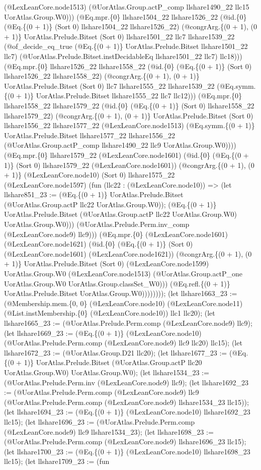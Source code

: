 \documentclass[11pt]{article}
\begin{document}
(@LexLeanCore.node1513) (@UorAtlas.Group.actP\_comp llshare1490\_22 llc15 UorAtlas.Group.W0))) (@Eq.mpr.\{0\} llshare1504\_22 llshare1526\_22 (@id.\{0\} (@Eq.\{(0 + 1)\} (Sort 0) llshare1504\_22 llshare1526\_22) (@congrArg.\{(0 + 1), (0 + 1)\} UorAtlas.Prelude.Bitset (Sort 0) llshare1501\_22 llc7 llshare1539\_22 (@of\_decide\_eq\_true (@Eq.\{(0 + 1)\} UorAtlas.Prelude.Bitset llshare1501\_22 llc7) (@UorAtlas.Prelude.Bitset.instDecidableEq llshare1501\_22 llc7) llc18))) (@Eq.mpr.\{0\} llshare1526\_22 llshare1558\_22 (@id.\{0\} (@Eq.\{(0 + 1)\} (Sort 0) llshare1526\_22 llshare1558\_22) (@congrArg.\{(0 + 1), (0 + 1)\} UorAtlas.Prelude.Bitset (Sort 0) llc7 llshare1555\_22 llshare1539\_22 (@Eq.symm.\{(0 + 1)\} UorAtlas.Prelude.Bitset llshare1555\_22 llc7 llc12))) (@Eq.mpr.\{0\} llshare1558\_22 llshare1579\_22 (@id.\{0\} (@Eq.\{(0 + 1)\} (Sort 0) llshare1558\_22 llshare1579\_22) (@congrArg.\{(0 + 1), (0 + 1)\} UorAtlas.Prelude.Bitset (Sort 0) llshare1556\_22 llshare1577\_22 (@LexLeanCore.node1513) (@Eq.symm.\{(0 + 1)\} UorAtlas.Prelude.Bitset llshare1577\_22 llshare1556\_22 (@UorAtlas.Group.actP\_comp llshare1490\_22 llc9 UorAtlas.Group.W0)))) (@Eq.mpr.\{0\} llshare1579\_22 (@LexLeanCore.node1601) (@id.\{0\} (@Eq.\{(0 + 1)\} (Sort 0) llshare1579\_22 (@LexLeanCore.node1601)) (@congrArg.\{(0 + 1), (0 + 1)\} (@LexLeanCore.node10) (Sort 0) llshare1575\_22 (@LexLeanCore.node1597) (fun (llc22 : (@LexLeanCore.node10)) => (let llshare851\_23 := (@Eq.\{(0 + 1)\} UorAtlas.Prelude.Bitset (@UorAtlas.Group.actP llc22 UorAtlas.Group.W0)); (@Eq.\{(0 + 1)\} UorAtlas.Prelude.Bitset (@UorAtlas.Group.actP llc22 UorAtlas.Group.W0) UorAtlas.Group.W0))) (@UorAtlas.Prelude.Perm.inv\_comp (@LexLeanCore.node9) llc9))) (@Eq.mpr.\{0\} (@LexLeanCore.node1601) (@LexLeanCore.node1621) (@id.\{0\} (@Eq.\{(0 + 1)\} (Sort 0) (@LexLeanCore.node1601) (@LexLeanCore.node1621)) (@congrArg.\{(0 + 1), (0 + 1)\} UorAtlas.Prelude.Bitset (Sort 0) (@LexLeanCore.node1599) UorAtlas.Group.W0 (@LexLeanCore.node1513) (@UorAtlas.Group.actP\_one UorAtlas.Group.W0 UorAtlas.Group.classSet\_W0))) (@Eq.refl.\{(0 + 1)\} UorAtlas.Prelude.Bitset UorAtlas.Group.W0)))))))); (let llshare1663\_23 := (@Membership.mem.\{0, 0\} (@LexLeanCore.node10) (@LexLeanCore.node11) (@List.instMembership.\{0\} (@LexLeanCore.node10)) llc1 llc20); (let llshare1665\_23 := (@UorAtlas.Prelude.Perm.comp (@LexLeanCore.node9) llc9); (let llshare1669\_23 := (@Eq.\{(0 + 1)\} (@LexLeanCore.node10) (@UorAtlas.Prelude.Perm.comp (@LexLeanCore.node9) llc9 llc20) llc15); (let llshare1672\_23 := (@UorAtlas.Group.D21 llc20); (let llshare1677\_23 := (@Eq.\{(0 + 1)\} UorAtlas.Prelude.Bitset (@UorAtlas.Group.actP llc20 UorAtlas.Group.W0) UorAtlas.Group.W0); (let llshare1534\_23 := (@UorAtlas.Prelude.Perm.inv (@LexLeanCore.node9) llc9); (let llshare1692\_23 := (@UorAtlas.Prelude.Perm.comp (@LexLeanCore.node9) llc9 (@UorAtlas.Prelude.Perm.comp (@LexLeanCore.node9) llshare1534\_23 llc15)); (let llshare1694\_23 := (@Eq.\{(0 + 1)\} (@LexLeanCore.node10) llshare1692\_23 llc15); (let llshare1696\_23 := (@UorAtlas.Prelude.Perm.comp (@LexLeanCore.node9) llc9 llshare1534\_23); (let llshare1698\_23 := (@UorAtlas.Prelude.Perm.comp (@LexLeanCore.node9) llshare1696\_23 llc15); (let llshare1700\_23 := (@Eq.\{(0 + 1)\} (@LexLeanCore.node10) llshare1698\_23 llc15); (let llshare1709\_23 := (fun 
\end{document}
